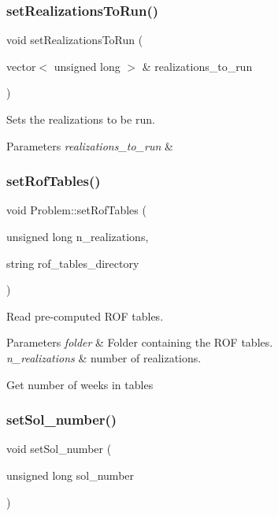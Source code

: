 \subsubsection{\texorpdfstring{set\+Realizations\+To\+Run()}{setRealizationsToRun()}}
{\footnotesize\ttfamily void set\+Realizations\+To\+Run (\begin{DoxyParamCaption}\item[{vector$<$ unsigned long $>$ \&}]{realizations\+\_\+to\+\_\+run }\end{DoxyParamCaption})}



Sets the realizations to be run. 


\begin{DoxyParams}{Parameters}
{\em realizations\+\_\+to\+\_\+run} & \\
\hline
\end{DoxyParams}
\mbox{\label{classProblem_aa9debdf28260fd9054f7d6d2ee516f94_aa9debdf28260fd9054f7d6d2ee516f94}} 
\subsubsection{\texorpdfstring{set\+Rof\+Tables()}{setRofTables()}}
{\footnotesize\ttfamily void Problem\+::set\+Rof\+Tables (\begin{DoxyParamCaption}\item[{unsigned long}]{n\+\_\+realizations,  }\item[{string}]{rof\+\_\+tables\+\_\+directory }\end{DoxyParamCaption})}

Read pre-\/computed R\+OF tables. 
\begin{DoxyParams}{Parameters}
{\em folder} & Folder containing the R\+OF tables. \\
\hline
{\em n\+\_\+realizations} & number of realizations. \\
\hline
\end{DoxyParams}
Get number of weeks in tables \mbox{\label{classProblem_a99967aa4531eac73e5a2928a0df0ea86_a99967aa4531eac73e5a2928a0df0ea86}} 
\subsubsection{\texorpdfstring{set\+Sol\+\_\+number()}{setSol\_number()}}
{\footnotesize\ttfamily void set\+Sol\+\_\+number (\begin{DoxyParamCaption}\item[{unsigned long}]{sol\+\_\+number }\end{DoxyParamCaption})}



